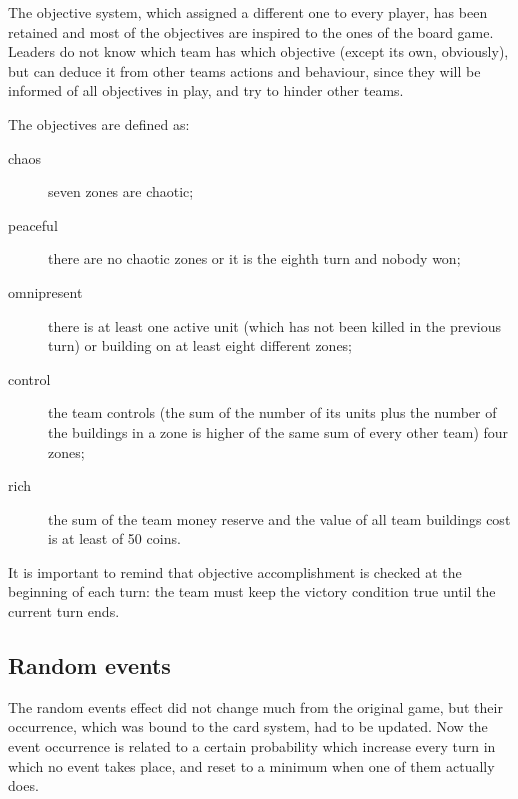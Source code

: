 			The objective system, which assigned a different one to every player, has been retained and most of the objectives are inspired to the ones of the board game. Leaders do not know which team has which objective (except its own, obviously), but can deduce it from other teams actions and behaviour, since they will be informed of all objectives in play, and try to hinder other teams.
			
			The objectives are defined as:
			\begin{description}
				\item[chaos] seven zones are chaotic;
				\item[peaceful] there are no chaotic zones or it is the eighth turn and nobody won;
				\item[omnipresent] there is at least one active unit (which has not been killed in the previous turn) or building on at least eight different zones;
				\item[control] the team controls (the sum of the number of its units plus the number of the buildings in a zone is higher of the same sum of every other team) four zones;
				\item[rich] the sum of the team money reserve and the value of all team buildings cost is at least of 50 coins.
			\end{description}
			
			It is important to remind that objective accomplishment is checked at the beginning of each turn: the team must keep the victory condition true until the current turn ends.
			
		\subsection{Random events}
			
			The random events effect did not change much from the original game, but their occurrence, which was bound to the card system, had to be updated. Now the event occurrence is related to a certain probability which increase every turn in which no event takes place, and reset to a minimum when one of them actually does.
			
